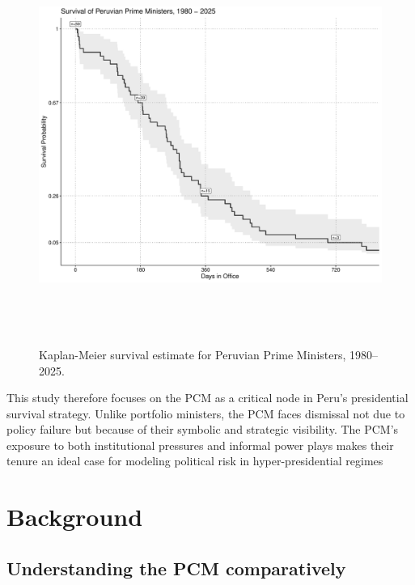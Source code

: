 \documentclass[a4paper, 12pt]{article}
\begin{document}
\begin{figure}[ht]
\centering
\includegraphics[width=\textwidth,height=13cm]{kaplanDuration.pdf}
\caption[Survival of Prime Ministers in Peru]{Kaplan-Meier survival estimate for Peruvian Prime Ministers, 1980--2025.}
\label{kaplanDuration} 
\end{figure}

This study therefore focuses on the PCM as a critical node in Peru’s presidential survival strategy. Unlike portfolio ministers, the PCM faces dismissal not due to policy failure but because of their symbolic and strategic visibility. The PCM’s exposure to both institutional pressures and informal power plays makes their tenure an ideal case for modeling political risk in hyper-presidential regimes




\section{Background}\label{backg-tables} %


\subsection{Understanding the PCM comparatively}
\end{document}

